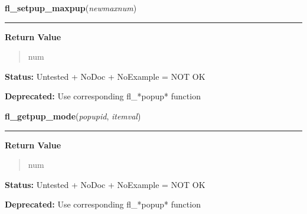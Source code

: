     \label{xformslib:deprecated:fl_setpup_maxpup}

    \vspace{0.5ex}

\hspace{.8\funcindent}\begin{boxedminipage}{\funcwidth}

    \raggedright \textbf{fl\_setpup\_maxpup}(\textit{newmaxnum})

    \vspace{-1.5ex}

    \rule{\textwidth}{0.5\fboxrule}
\setlength{\parskip}{2ex}
\setlength{\parskip}{1ex}
      \textbf{Return Value}
    \vspace{-1ex}

      \begin{quote}
      num

      \end{quote}

\textbf{Status:} Untested + NoDoc + NoExample = NOT OK



\textbf{Deprecated:} Use corresponding fl\_*popup* function



    \end{boxedminipage}

    \label{xformslib:deprecated:fl_getpup_mode}

    \vspace{0.5ex}

\hspace{.8\funcindent}\begin{boxedminipage}{\funcwidth}

    \raggedright \textbf{fl\_getpup\_mode}(\textit{popupid}, \textit{itemval})

    \vspace{-1.5ex}

    \rule{\textwidth}{0.5\fboxrule}
\setlength{\parskip}{2ex}
\setlength{\parskip}{1ex}
      \textbf{Return Value}
    \vspace{-1ex}

      \begin{quote}
      num

      \end{quote}

\textbf{Status:} Untested + NoDoc + NoExample = NOT OK



\textbf{Deprecated:} Use corresponding fl\_*popup* function



    \end{boxedminipage}

